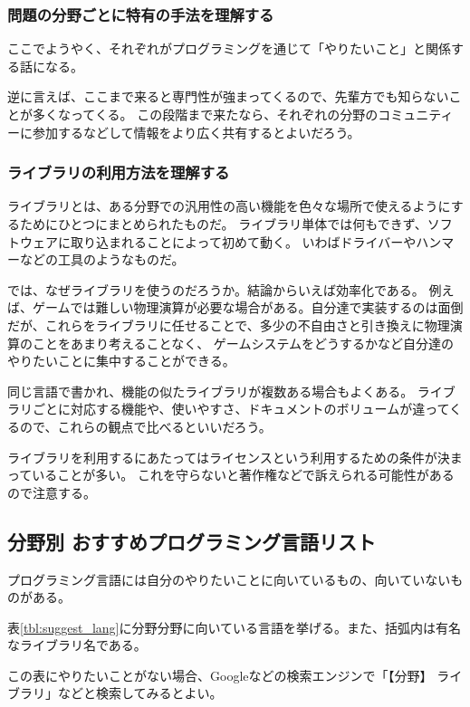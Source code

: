 \documentclass[lualatex,ja=standard,12pt,a4j]{bxjsbook}
\begin{document}
				\subsubsection{問題の分野ごとに特有の手法を理解する}
	                ここでようやく、それぞれがプログラミングを通じて「やりたいこと」と関係する話になる。
	                
	                逆に言えば、ここまで来ると専門性が強まってくるので、先輩方でも知らないことが多くなってくる。
	                この段階まで来たなら、それぞれの分野のコミュニティーに参加するなどして情報をより広く共有するとよいだろう。
					
				\subsubsection{ライブラリの利用方法を理解する}
			        ライブラリとは、ある分野での汎用性の高い機能を色々な場所で使えるようにするためにひとつにまとめられたものだ。
			        ライブラリ単体では何もできず、ソフトウェアに取り込まれることによって初めて動く。
			        いわばドライバーやハンマーなどの工具のようなものだ。
			        
			        では、なぜライブラリを使うのだろうか。結論からいえば効率化である。
			        例えば、ゲームでは難しい物理演算が必要な場合がある。自分達で実装するのは面倒だが、これらをライブラリに任せることで、多少の不自由さと引き換えに物理演算のことをあまり考えることなく、
			        ゲームシステムをどうするかなど自分達のやりたいことに集中することができる。
			        
			        同じ言語で書かれ、機能の似たライブラリが複数ある場合もよくある。
			        ライブラリごとに対応する機能や、使いやすさ、ドキュメントのボリュームが違ってくるので、これらの観点で比べるといいだろう。 
			        
			        ライブラリを利用するにあたってはライセンスという利用するための条件が決まっていることが多い。
			        これを守らないと著作権などで訴えられる可能性があるので注意する。
			\subsection{分野別 おすすめプログラミング言語リスト}
				プログラミング言語には自分のやりたいことに向いているもの、向いていないものがある。
				
				表\ref{tbl:suggest_lang}に分野分野に向いている言語を挙げる。また、括弧内は有名なライブラリ名である。
				
				この表にやりたいことがない場合、Googleなどの検索エンジンで「【分野】 ライブラリ」などと検索してみるとよい。
				
\end{document}
